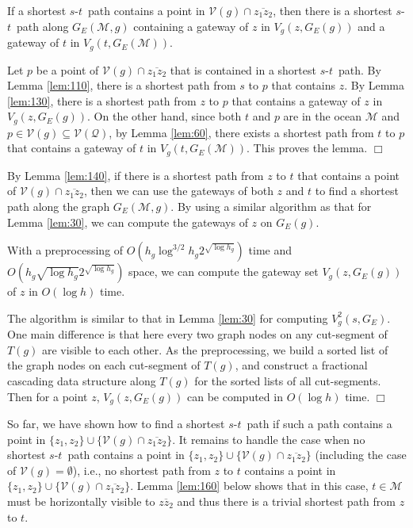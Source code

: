 \documentclass[english,runningheads,11pt]{llncs}
\def\calM{\mathcal{M}}
\def\calQ{\mathcal{Q}}
\def\calV{\mathcal{V}}
\def\st{$s$-$t$}
\newenvironment{proof}{\noindent {\textbf{Proof:}}\rm}{\hfill $\Box$\rm}
\begin{document}
\begin{lemma}\label{lem:140}
If a shortest \st\ path contains a point in $\calV(g)\cap \overline{z_1z_2}$,
then there is a shortest \st\ path along $G_E(\calM,g)$ containing
a gateway of $z$ in $V_g(z,G_E(g))$ and a gateway of $t$ in
$V_g(t,G_E(\calM))$.
\end{lemma}
\begin{proof}
Let $p$ be a point of $\calV(g)\cap \overline{z_1z_2}$ that is
contained in a shortest \st\ path. By Lemma \ref{lem:110}, there is a
shortest path from $s$ to $p$ that contains $z$. By Lemma
\ref{lem:130}, there is a shortest path from $z$ to $p$ that contains
a gateway of $z$ in $V_g(z,G_E(g))$. On the other hand, since both $t$
and $p$ are in the ocean $\calM$ and $p\in \calV(g)\subseteq \calV(\calQ)$,
by Lemma \ref{lem:60}, there exists
a shortest path from $t$ to $p$ that contains a gateway of $t$ in
$V_g(t,G_E(\calM))$.  This proves the lemma.
\end{proof}

By Lemma \ref{lem:140}, if there is a shortest path from $z$ to $t$
that contains a
point of $\calV(g)\cap \overline{z_1z_2}$, then we can use the gateways
of both $z$ and $t$ to find a shortest path along the graph $G_E(\calM,g)$.
By using a similar algorithm as that for Lemma \ref{lem:30}, we can
compute the gateways of $z$ on $G_E(g)$.

\begin{lemma}\label{lem:150}
With a preprocessing of $O(h_g\log^{3/2}h_g2^{\sqrt{\log h_g}})$ time and
$O(h_g\sqrt{\log h_g}2^{\sqrt{\log h_g}})$ space,  we
can compute the gateway set $V_g(z,G_E(g))$ of $z$ in $O(\log h)$ time.
\end{lemma}
\begin{proof}
The algorithm is similar to that in Lemma \ref{lem:30} for computing
$V^2_g(s,G_E)$. One main difference is that here every two graph
nodes on any cut-segment of $T(g)$ are visible to each other.
As the preprocessing, we build a sorted list of the graph nodes on each
cut-segment of $T(g)$, and construct a fractional cascading data
structure \cite{ref:ChazelleFr86} along $T(g)$ for the sorted lists of all
cut-segments. Then for a point
$z$, $V_g(z,G_E(g))$ can be computed in $O(\log h)$ time.
\end{proof}

So far, we have shown how to find a shortest \st\ path if such a path
contains a point in $\{z_1,z_2\}\cup \{\calV(g)\cap \overline{z_1z_2}\}$.
It remains to handle the case when
no shortest \st\ path contains a point in
$\{z_1,z_2\}\cup \{\calV(g)\cap \overline{z_1z_2}\}$ (including the case of
$\calV(g)=\emptyset$), i.e.,
no shortest path from $z$ to $t$ contains a point in
$\{z_1,z_2\}\cup \{\calV(g)\cap \overline{z_1z_2}\}$.
Lemma \ref{lem:160} below shows that in this case, $t\in \calM$ must be horizontally
visible to $\overline{zz_2}$ and thus there is a trivial shortest
path from $z$ to $t$.
\end{document}
